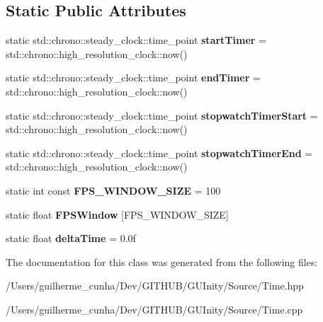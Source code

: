 \subsection*{Static Public Attributes}
\begin{DoxyCompactItemize}
\item 
\hypertarget{class_time_a2c64046009efbc62bf3486391302d0ee}{}static std\+::chrono\+::steady\+\_\+clock\+::time\+\_\+point {\bfseries start\+Timer} = std\+::chrono\+::high\+\_\+resolution\+\_\+clock\+::now()\label{class_time_a2c64046009efbc62bf3486391302d0ee}

\item 
\hypertarget{class_time_a5ab0feade8e1d298c12e39991e649ad8}{}static std\+::chrono\+::steady\+\_\+clock\+::time\+\_\+point {\bfseries end\+Timer} = std\+::chrono\+::high\+\_\+resolution\+\_\+clock\+::now()\label{class_time_a5ab0feade8e1d298c12e39991e649ad8}

\item 
\hypertarget{class_time_a0afefc81a7f84f55a68a9ed00b3c3db5}{}static std\+::chrono\+::steady\+\_\+clock\+::time\+\_\+point {\bfseries stopwatch\+Timer\+Start} = std\+::chrono\+::high\+\_\+resolution\+\_\+clock\+::now()\label{class_time_a0afefc81a7f84f55a68a9ed00b3c3db5}

\item 
\hypertarget{class_time_ab4e2088cc1b2939f8b594e13fdbd5a49}{}static std\+::chrono\+::steady\+\_\+clock\+::time\+\_\+point {\bfseries stopwatch\+Timer\+End} = std\+::chrono\+::high\+\_\+resolution\+\_\+clock\+::now()\label{class_time_ab4e2088cc1b2939f8b594e13fdbd5a49}

\item 
\hypertarget{class_time_aa7a5bd1277346a136b58540ecdeffde1}{}static int const {\bfseries F\+P\+S\+\_\+\+W\+I\+N\+D\+O\+W\+\_\+\+S\+I\+Z\+E} = 100\label{class_time_aa7a5bd1277346a136b58540ecdeffde1}

\item 
\hypertarget{class_time_a4f54c25041485d563316557cb0e7e4bb}{}static float {\bfseries F\+P\+S\+Window} \mbox{[}F\+P\+S\+\_\+\+W\+I\+N\+D\+O\+W\+\_\+\+S\+I\+Z\+E\mbox{]}\label{class_time_a4f54c25041485d563316557cb0e7e4bb}

\item 
\hypertarget{class_time_a35fe30294c847679da506b540f05d593}{}static float {\bfseries delta\+Time} = 0.\+0f\label{class_time_a35fe30294c847679da506b540f05d593}

\end{DoxyCompactItemize}


The documentation for this class was generated from the following files\+:\begin{DoxyCompactItemize}
\item 
/\+Users/guilherme\+\_\+cunha/\+Dev/\+G\+I\+T\+H\+U\+B/\+G\+U\+Inity/\+Source/Time.\+hpp\item 
/\+Users/guilherme\+\_\+cunha/\+Dev/\+G\+I\+T\+H\+U\+B/\+G\+U\+Inity/\+Source/Time.\+cpp\end{DoxyCompactItemize}
